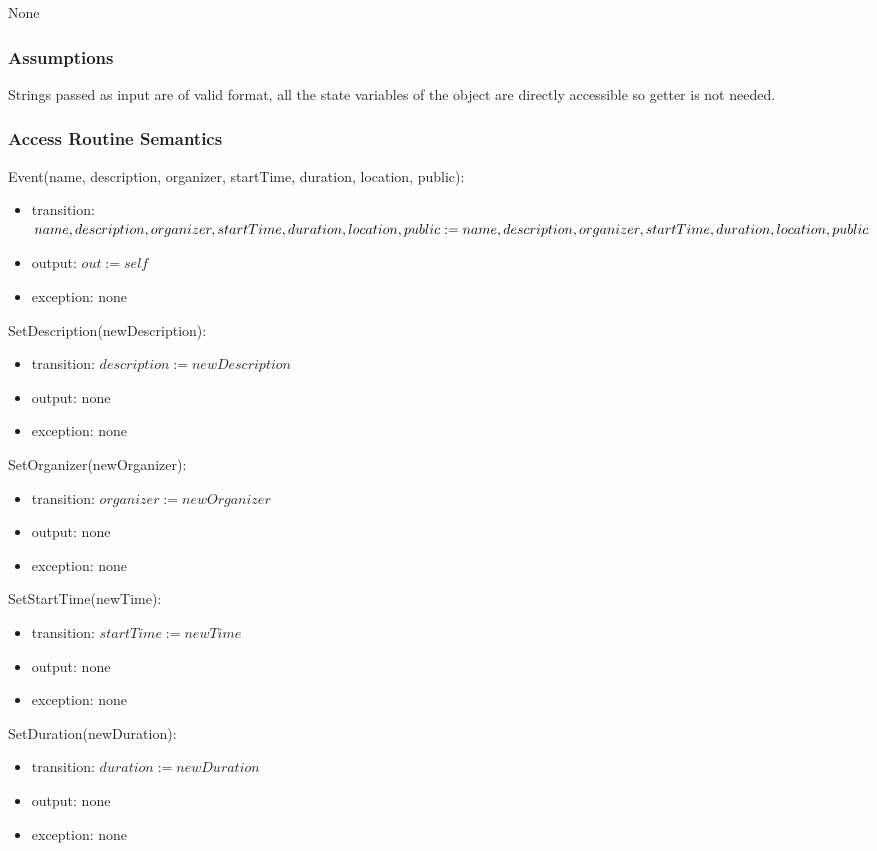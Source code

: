 \documentclass[12pt, titlepage]{article}
\begin{document}
None

\subsubsection{Assumptions}

Strings passed as input are of valid format, all the state variables of the object are directly accessible so getter is not needed.

\subsubsection{Access Routine Semantics}

\noindent Event(name, description, organizer, startTime, duration, location, public):
\begin{itemize}
\item transition: $name, description, organizer, startTime, duration, location, public := \\ name, description, organizer, startTime, duration, location, public$
\item output: $out := self$
\item exception: none
\end{itemize}

\noindent SetDescription(newDescription):
\begin{itemize}
\item transition: $description := newDescription$
\item output: none
\item exception: none
\end{itemize}

\noindent SetOrganizer(newOrganizer):
\begin{itemize}
\item transition: $organizer := newOrganizer$
\item output: none
\item exception: none
\end{itemize}

\noindent SetStartTime(newTime):
\begin{itemize}
\item transition: $startTime := newTime$
\item output: none
\item exception: none
\end{itemize}

\noindent SetDuration(newDuration):
\begin{itemize}
\item transition: $duration := newDuration$
\item output: none
\item exception: none
\end{itemize}
\end{document}
